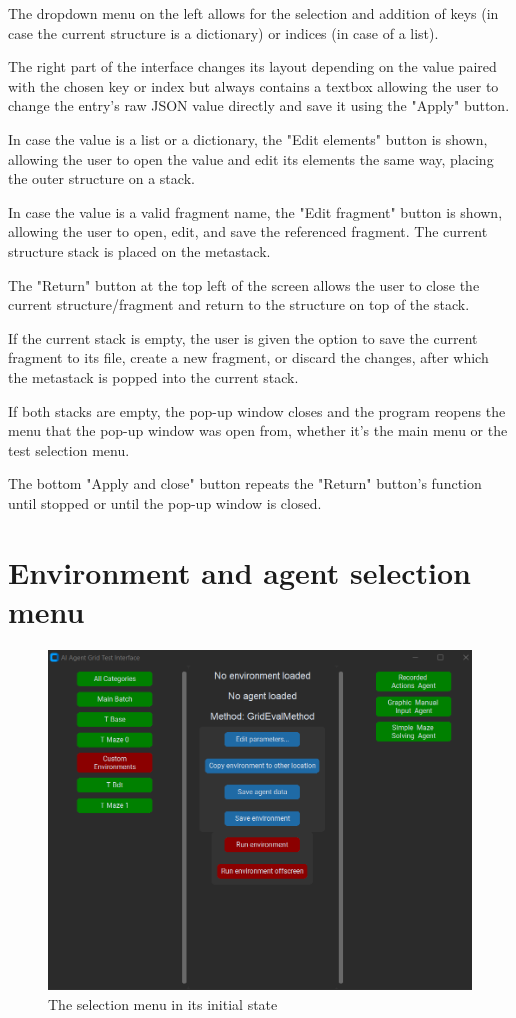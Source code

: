 \documentclass[masterthesis]{fer}
\begin{document}
The dropdown menu on the left allows for the selection and addition of keys (in case the current structure is a dictionary) or indices (in case of a list).

The right part of the interface changes its layout depending on the value paired with the chosen key or index but always contains a textbox allowing the user to change the entry's raw JSON value directly and save it using the "Apply" button.

In case the value is a list or a dictionary, the "Edit elements" button is shown, allowing the user to open the value and edit its elements the same way, placing the outer structure on a stack.

In case the value is a valid fragment name, the "Edit fragment" button is shown, allowing the user to open, edit, and save the referenced fragment. The current structure stack is placed on the metastack.

The "Return" button at the top left of the screen allows the user to close the current structure/fragment and return to the structure on top of the stack.

If the current stack is empty, the user is given the option to save the current fragment to its file, create a new fragment, or discard the changes, after which the metastack is popped into the current stack.

If both stacks are empty, the pop-up window closes and the program reopens the menu that the pop-up window was open from, whether it's the main menu or the test selection menu.

The bottom "Apply and close" button repeats the "Return" button's function until stopped or until the pop-up window is closed.

\section{Environment and agent selection menu}
\begin{figure}[htb]
  \centering
  \includegraphics[width=0.5\linewidth]{Figures/thesis selection menu.png} 
  \caption{The selection menu in its initial state}
  \label{slk:thesis_selection_menu}
\end{figure}
\end{document}
